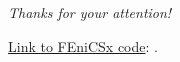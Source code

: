 \begin{frame}{}
	\vspace*{1.5cm}
  \begin{center}
	{\Huge
		\emph{Thanks for your attention!}}
  \end{center}
	
	\vspace*{1cm}

  \underline{Link to FEniCSx code}: .


\end{frame}